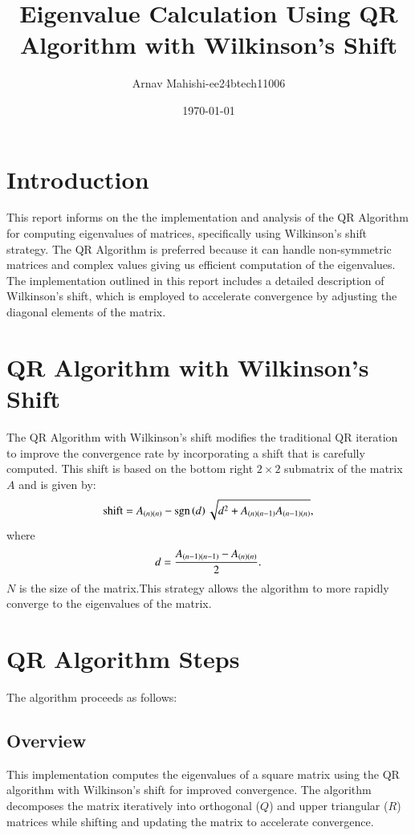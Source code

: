 \documentclass[journal]{IEEEtran}
\title{Eigenvalue Calculation Using QR Algorithm with Wilkinson's Shift}
\author{Arnav Mahishi-ee24btech11006}
\date{\today}
\begin{document}
\maketitle

\section{Introduction}
This report informs on the  the implementation and analysis of the QR Algorithm for computing eigenvalues of matrices, specifically using Wilkinson's shift strategy. The QR Algorithm is preferred because it can handle non-symmetric matrices and complex values giving us efficient computation of the eigenvalues. The implementation outlined in this report includes a detailed description of Wilkinson's shift, which is employed to accelerate convergence by adjusting the diagonal elements of the matrix.

\section{QR Algorithm with Wilkinson's Shift}
The QR Algorithm with Wilkinson's shift modifies the traditional QR iteration to improve the convergence rate by incorporating a shift that is carefully computed. This shift is based on the bottom right $2\times 2$ submatrix of the matrix $A$ and is given by:
\begin{align}
\text{shift} = A_{\left(n\right)\left(n\right)} - \mathop{\mathrm{sgn}}\left(d\right) \sqrt{d^2 + A_{\left(n\right)\left(n-1\right)} A_{\left(n-1\right)\left(n\right)}},
\end{align}
where
\begin{align}
d = \frac{A_{\left(n-1\right)\left(n-1\right)} - A_{\left(n\right)\left(n\right)}}{2}.
\end{align}
$N$ is the size of the matrix.This strategy allows the algorithm to more rapidly converge to the eigenvalues of the matrix.
\section{QR Algorithm Steps}
The algorithm proceeds as follows:

\subsection{Overview}
This implementation computes the eigenvalues of a square matrix using the QR algorithm with Wilkinson's shift for improved convergence. The algorithm decomposes the matrix iteratively into orthogonal ($Q$) and upper triangular ($R$) matrices while shifting and updating the matrix to accelerate convergence.
\end{document}
